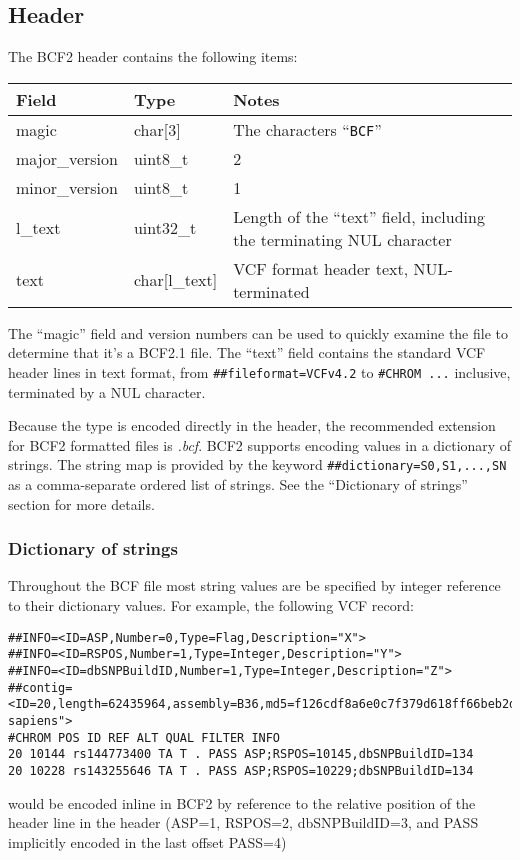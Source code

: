 \documentclass[8pt]{article}
\begin{document}
\subsection{Header}
The BCF2 header contains the following items:

\vspace{0.3cm}
{\small
\begin{tabular}{|l | l | p{30em} | } \hline
\textbf{Field} & \textbf{Type} & \textbf{Notes} \\ \hline
magic          & char[3]     & The characters ``{\tt BCF}'' \\ \hline
major\_version & uint8\_t    & 2 \\ \hline
minor\_version & uint8\_t    & 1 \\ \hline
l\_text        & uint32\_t   & Length of the ``text'' field, including the terminating NUL character \\ \hline
text           & char[l\_text] & VCF format header text, NUL-terminated \\ \hline
\end{tabular}}
\vspace{0.3cm}

The ``magic'' field and version numbers can be used to quickly examine the file to determine that it's a BCF2.1 file.
The ``text'' field contains the standard VCF header lines in text format, from \verb|##fileformat=VCFv4.2|
to \verb|#CHROM ...| inclusive, terminated by a NUL character.

Because the type is encoded directly in the header, the recommended extension for BCF2 formatted files is {\sl .bcf}.
BCF2 supports encoding values in a dictionary of strings.
The string map is provided by the keyword \verb|##dictionary=S0,S1,...,SN| as a comma-separate ordered list of strings.
See the ``Dictionary of strings'' section for more details.

\subsubsection{Dictionary of strings}

Throughout the BCF file most string values are be specified by integer
reference to their dictionary values.  For example, the following VCF record:
\small
\begin{verbatim}
##INFO=<ID=ASP,Number=0,Type=Flag,Description="X">
##INFO=<ID=RSPOS,Number=1,Type=Integer,Description="Y">
##INFO=<ID=dbSNPBuildID,Number=1,Type=Integer,Description="Z">
##contig=<ID=20,length=62435964,assembly=B36,md5=f126cdf8a6e0c7f379d618ff66beb2da,species="Homo sapiens">
#CHROM POS ID REF ALT QUAL FILTER INFO
20 10144 rs144773400 TA T . PASS ASP;RSPOS=10145,dbSNPBuildID=134
20 10228 rs143255646 TA T . PASS ASP;RSPOS=10229;dbSNPBuildID=134
\end{verbatim}
\normalsize
would be encoded inline in BCF2 by reference to the relative position of the header line in the header (ASP=1, RSPOS=2, dbSNPBuildID=3, and PASS implicitly encoded in the last offset PASS=4)
\end{document}
